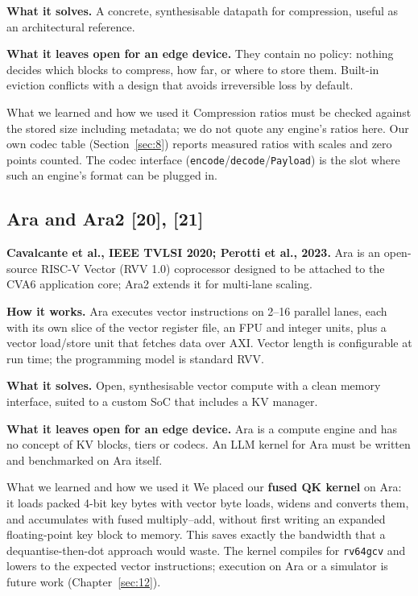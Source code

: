 \documentclass[12pt,a4paper]{report}
\begin{document}
\textbf{What it solves.} A concrete, synthesisable datapath for compression, useful as an architectural reference.

\textbf{What it leaves open for an edge device.} They contain no policy: nothing decides which blocks to compress, how far, or where to store them. Built-in eviction conflicts with a design that avoids irreversible loss by default.

\begin{calloutbox}{What we learned and how we used it}
Compression ratios must be checked against the stored size including metadata; we do not quote any engine's ratios here. Our own codec table (Section~\ref{sec:8}) reports measured ratios with scales and zero points counted. The codec interface (\texttt{encode}/\texttt{decode}/\texttt{Payload}) is the slot where such an engine's format can be plugged in.

\end{calloutbox}
\subsection{Ara and Ara2 [20], [21]}
\textbf{Cavalcante et al., IEEE TVLSI 2020; Perotti et al., 2023.} Ara is an open-source RISC-V Vector (RVV 1.0) coprocessor designed to be attached to the CVA6 application core; Ara2 extends it for multi-lane scaling.

\textbf{How it works.} Ara executes vector instructions on 2–16 parallel lanes, each with its own slice of the vector register file, an FPU and integer units, plus a vector load/store unit that fetches data over AXI. Vector length is configurable at run time; the programming model is standard RVV.

\textbf{What it solves.} Open, synthesisable vector compute with a clean memory interface, suited to a custom SoC that includes a KV manager.

\textbf{What it leaves open for an edge device.} Ara is a compute engine and has no concept of KV blocks, tiers or codecs. An LLM kernel for Ara must be written and benchmarked on Ara itself.

\begin{calloutbox}{What we learned and how we used it}
We placed our \textbf{fused QK kernel} on Ara: it loads packed 4-bit key bytes with vector byte loads, widens and converts them, and accumulates with fused multiply–add, without first writing an expanded floating-point key block to memory. This saves exactly the bandwidth that a dequantise-then-dot approach would waste. The kernel compiles for \texttt{rv64gcv} and lowers to the expected vector instructions; execution on Ara or a simulator is future work (Chapter~\ref{sec:12}).

\end{calloutbox}
\end{document}
